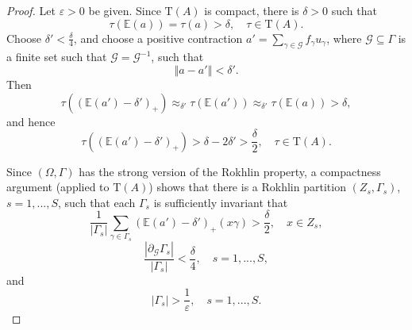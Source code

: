 \documentclass[10pt,a4paper]{amsart}
\newcommand{\abs}[1]{\left\vert#1\right\vert}
\newcommand{\eps}{\varepsilon}
\newcommand{\norm}[1]{\left\Vert#1\right\Vert}
\newcommand{\tr}{\mathrm{T}}
\begin{document}
\begin{proof}
%
Let $\eps>0$ be given. Since $\tr(A)$ is compact, there is $\delta>0$ such that $$\tau(\mathbb E(a)) = \tau(a) > \delta,\quad \tau \in \tr(A). $$ 
Choose $\delta' < \frac{\delta}{4}$, and choose a positive contraction $a' = \sum_{\gamma \in \mathcal G} f_\gamma u_\gamma$, where $\mathcal G \subseteq \Gamma$ is a finite set such that $\mathcal G = \mathcal G^{-1}$, such that 
\begin{equation}\label{alg-approx}
\norm{a - a'} < \delta' . 
\end{equation}
Then 
$$ \tau((\mathbb E(a') - \delta')_+) \approx_{\delta'} \tau(\mathbb E(a')) \approx_{\delta'} \tau(\mathbb E(a)) > \delta,$$
and hence
$$ \tau( (\mathbb E(a') - \delta')_+ ) > \delta - 2\delta' > \frac{\delta}{2}, \quad \tau \in \tr(A).$$

Since $(\Omega, \Gamma)$ has the strong version of the Rokhlin property,  a compactness argument (applied to $\tr(A)$) shows that there is a Rokhlin partition $(Z_s, \Gamma_s)$, $s=1, ..., S$, such that each $\Gamma_s$ is sufficiently invariant that 
\begin{equation}\label{avg-1}
\frac{1}{\abs{\Gamma_s}} \sum_{\gamma\in \Gamma_s} (\mathbb E(a') - \delta')_+(x \gamma) > \frac{\delta}{2}, \quad x\in Z_s,
\end{equation}
\begin{equation}\label{avg-2}
\frac{\abs{\partial_{\mathcal G} \Gamma_s}}{\abs{\Gamma_s}} < \frac{\delta}{4},\quad s=1, ..., S,
\end{equation}
and
\begin{equation}\label{large-G}
\abs{\Gamma_s} > \frac{1}{\eps},\quad s=1, ..., S.
\end{equation}


\end{proof}
\end{document}
